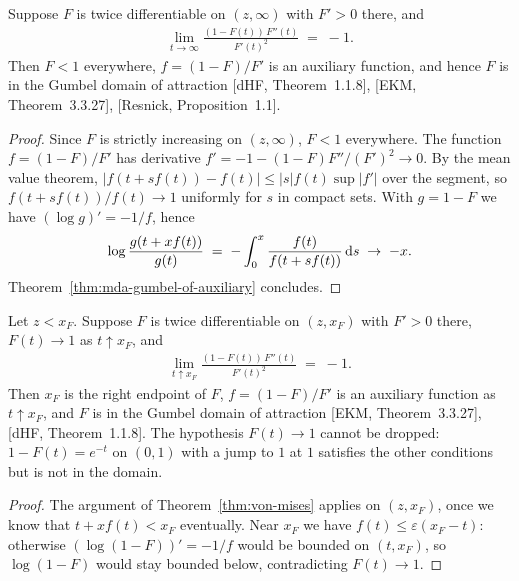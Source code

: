 \begin{theorem}
  \label{thm:von-mises}
  \leanok
  Suppose $F$ is twice differentiable on $(z, \infty)$ with $F' > 0$ there, and
  \begin{align*}
    \lim_{t \to \infty} \frac{(1 - F(t)) \, F''(t)}{F'(t)^2} \; = \; -1 .
  \end{align*}
  Then $F < 1$ everywhere, $f = (1 - F)/F'$ is an auxiliary function, and hence $F$ is in the
  Gumbel domain of attraction [dHF, Theorem~1.1.8], [EKM, Theorem~3.3.27],
  [Resnick, Proposition~1.1].
\end{theorem}
\begin{proof}
  \leanok
  Since $F$ is strictly increasing on $(z, \infty)$, $F < 1$ everywhere. The function
  $f = (1 - F)/F'$ has derivative $f' = -1 - (1-F) F''/(F')^2 \to 0$. By the mean value theorem,
  $|f(t + s f(t)) - f(t)| \le |s| f(t) \sup |f'|$ over the segment, so
  $f(t + s f(t))/f(t) \to 1$ uniformly for $s$ in compact sets. With $g = 1 - F$ we have
  $(\log g)' = -1/f$, hence
  \begin{align*}
    \log \frac{g(t + x f(t))}{g(t)} \; = \; - \int_0^x \frac{f(t)}{f(t + s f(t))} \, \mathrm{d} s
      \; \to \; -x .
  \end{align*}
  Theorem~\ref{thm:mda-gumbel-of-auxiliary} concludes.
\end{proof}

\begin{theorem}
  \label{thm:von-mises-finite}
  \leanok
  Let $z < x_F$. Suppose $F$ is twice differentiable on $(z, x_F)$ with $F' > 0$ there,
  $F(t) \to 1$ as $t \uparrow x_F$, and
  \begin{align*}
    \lim_{t \uparrow x_F} \frac{(1 - F(t)) \, F''(t)}{F'(t)^2} \; = \; -1 .
  \end{align*}
  Then $x_F$ is the right endpoint of $F$, $f = (1 - F)/F'$ is an auxiliary function as
  $t \uparrow x_F$, and $F$ is in the Gumbel domain of attraction [EKM, Theorem~3.3.27],
  [dHF, Theorem~1.1.8]. The hypothesis $F(t) \to 1$ cannot be dropped: $1 - F(t) = e^{-t}$ on
  $(0, 1)$ with a jump to $1$ at $1$ satisfies the other conditions but is not in the domain.
\end{theorem}
\begin{proof}
  \leanok
  The argument of Theorem~\ref{thm:von-mises} applies on $(z, x_F)$, once we know that
  $t + x f(t) < x_F$ eventually. Near $x_F$ we have $f(t) \le \varepsilon (x_F - t)$: otherwise
  $(\log(1-F))' = -1/f$ would be bounded on $(t, x_F)$, so $\log(1 - F)$ would stay bounded
  below, contradicting $F(t) \to 1$.
\end{proof}

